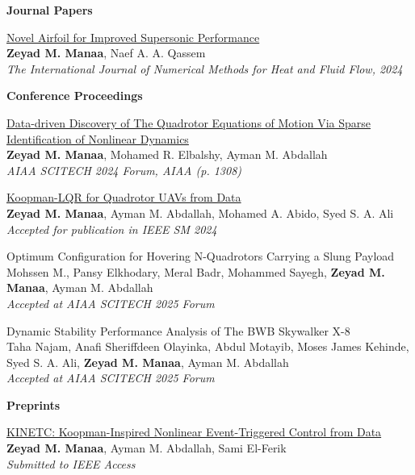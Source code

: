 \textbf{Journal Papers}
\begin{bibenum}
    \item \href{https://www.emerald.com/insight/content/doi/10.1108/HFF-06-2024-0433/full/html}{Novel Airfoil for Improved Supersonic Performance}\\
    \textbf{Zeyad M. Manaa}, Naef A. A. Qassem\\
    \textit{The International Journal of Numerical Methods for Heat and Fluid Flow, 2024}
\end{bibenum}
\vspace{0.5cm}

\textbf{Conference Proceedings}
\begin{bibenum}
    \item \href{https://arxiv.org/pdf/2305.16500}{{Data-driven Discovery of The Quadrotor Equations of Motion Via Sparse Identification of Nonlinear Dynamics}}\\
    \textbf{Zeyad M. Manaa}, Mohamed R. Elbalshy, Ayman M. Abdallah\\
    \textit{AIAA SCITECH 2024 Forum, AIAA (p. 1308)}

    \item \href{https://arxiv.org/pdf/2406.17973}{Koopman-LQR for Quadrotor UAVs from Data}\\
    \textbf{Zeyad M. Manaa}, Ayman M. Abdallah, Mohamed A. Abido, Syed S. A. Ali\\
    \textit{Accepted for publication in IEEE SM 2024}

    \item {Optimum Configuration for Hovering N-Quadrotors Carrying a Slung Payload}\\
    Mohssen M., Pansy Elkhodary, Meral Badr, Mohammed Sayegh, \textbf{Zeyad M. Manaa}, Ayman M. Abdallah\\
    \textit{Accepted at AIAA SCITECH 2025 Forum}

    \item {Dynamic Stability Performance Analysis of The BWB Skywalker X-8}\\
    Taha Najam, Anafi Sheriffdeen Olayinka, Abdul Motayib, Moses James Kehinde, Syed S. A. Ali, \textbf{Zeyad M. Manaa}, Ayman M. Abdallah\\
    \textit{Accepted at AIAA SCITECH 2025 Forum}
\end{bibenum}
\vspace{0.5cm}

\textbf{Preprints}
\begin{bibenum}
    \item \href{https://zmanaa.github.io/assets/publications/2024_KINETC/KINETC__Koopman_Inspired_Nonlinear_Event_Triggered_Control_from_Data.pdf}{KINETC: Koopman-Inspired Nonlinear Event-Triggered Control from Data}\\
    \textbf{Zeyad M. Manaa}, Ayman M. Abdallah, Sami El-Ferik\\
    \textit{Submitted to IEEE Access}
\end{bibenum}